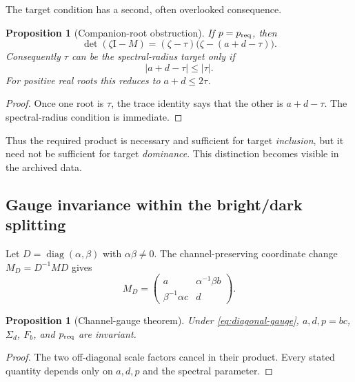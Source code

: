 \documentclass[11pt]{article}
\newtheorem{proposition}[theorem]{Proposition}
\theoremstyle{definition}
\theoremstyle{remark}
\newcommand{\Id}{\mathrm I}
\begin{document}
The target condition has a second, often overlooked consequence.

\begin{proposition}[Companion-root obstruction]
\label{prop:companion-root}
If $p=p_{\rm req}$, then
\begin{equation}\label{eq:companion-factorization}
 \det(\zeta\Id-M)
 =(\zeta-\tau)\bigl(\zeta-(a+d-\tau)\bigr).
\end{equation}
Consequently $\tau$ can be the spectral-radius target only if
\begin{equation}\label{eq:companion-condition}
 |a+d-\tau|\le |\tau|.
\end{equation}
For positive real roots this reduces to $a+d\le2\tau$.
\end{proposition}

\begin{proof}
Once one root is $\tau$, the trace identity says that the other is
$a+d-\tau$.  The spectral-radius condition is immediate.
\end{proof}

Thus the required product is necessary and sufficient for target
\emph{inclusion}, but it need not be sufficient for target
\emph{dominance}.  This distinction becomes visible in the archived data.

\subsection{Gauge invariance within the bright/dark splitting}

Let $D=\operatorname{diag}(\alpha,\beta)$ with $\alpha\beta\ne0$.  The
channel-preserving coordinate change $M_D=D^{-1}MD$ gives
\begin{equation}\label{eq:diagonal-gauge}
 M_D=
 \begin{pmatrix}
 a&\alpha^{-1}\beta b\\
 \beta^{-1}\alpha c&d
 \end{pmatrix}.
\end{equation}

\begin{proposition}[Channel-gauge theorem]
\label{prop:gauge-invariance}
Under \eqref{eq:diagonal-gauge}, $a,d,p=bc$, $\Sigma_d$, $F_b$, and
$p_{\rm req}$ are invariant.
\end{proposition}

\begin{proof}
The two off-diagonal scale factors cancel in their product.  Every stated
quantity depends only on $a,d,p$ and the spectral parameter.
\end{proof}
\end{document}
